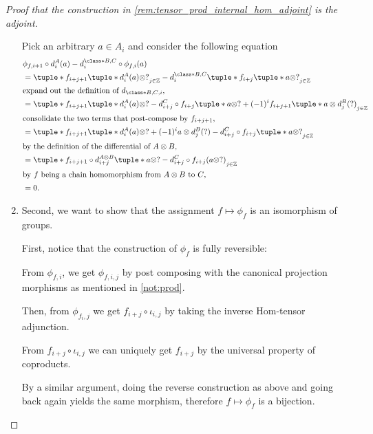 \begin{proof}[Proof that the construction in \autoref{rem:tensor_prod_internal_hom_adjoint} is the adjoint]
\begin{enumerate}
{            Pick an arbitrary \( a \in A_i \) and consider the following equation
            \begin{align*}
                &\phi_{f, i + 1} \circ d_i^A(a) - d_i^{\class*{B, C}} \circ \phi_{f, i}(a) \\
                &= \tuple*{ f_{i + j + 1}\tuple*{d_i^A(a) \otimes ?} }_{j \in \Zb}
                - d_i^{\class*{B, C}} \tuple*{ f_{i + j}\tuple*{a \otimes ?} }_{j \in \Zb} \\
                \intertext{expand out the definition of \( d_{\class*{B, C}, i} \),}
                &= \tuple*{ f_{i + j + 1}\tuple*{d_i^A(a) \otimes ?}
                - d_{i + j}^C \circ f_{i + j}\tuple*{a \otimes ?}
                + (-1)^i f_{i + j + 1}\tuple*{a \otimes d_j^B(?)} }_{j \in \Zb} \\
                \intertext{consolidate the two terms that post-compose by \( f_{i + j + 1} \),}
                &= \tuple*{ f_{i + j + 1}\tuple*{ d_i^A(a) \otimes ?
                + (-1)^ia \otimes d_j^B(?) }
                - d_{i + j}^C \circ f_{i + j}\tuple*{ a \otimes ? } }_{j \in \Zb} \\
                \intertext{by the definition of the differential of \( A \otimes B \),}
                &= \tuple*{ f_{i + j + 1} \circ d_{i + j}^{A \otimes B} \tuple*{ a \otimes ? }
                - d_{i + j}^C \circ f_{i + j} ( a \otimes ? ) }_{j \in \Zb} \\
                \intertext{by \( f \) being a chain homomorphism from \( A \otimes B \) to \( C \),}
                &= 0.
            \end{align*}
        }
        \item {
            Second, we want to show that the assignment \( f \mapsto \phi_f \) is an isomorphism of groups.

            First, notice that the construction of \( \phi_f \) is fully reversible:

            From \( \phi_{f, i} \), we get \( \phi_{f, i, j} \) by post composing with the canonical projection morphisms as mentioned in \autoref{not:prod}.

            Then, from \( \phi_{f_i, j} \) we get \( f_{i + j} \circ \iota_{i, j} \) by taking the inverse Hom-tensor adjunction.

            From \( f_{i + j} \circ \iota_{i, j} \) we can uniquely get \( f_{i + j} \) by the universal property of coproducts.

            By a similar argument, doing the reverse construction as above and going back again yields the same morphism, therefore \( f \mapsto \phi_f \) is a bijection.

}
\end{enumerate}
\end{proof}
